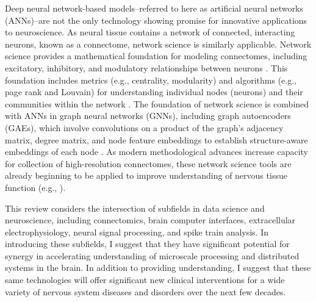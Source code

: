 \documentclass[11pt]{article}
\begin{document}
Deep neural network-based models--referred to here as artificial neural networks (ANNs)--are not the only technology showing promise for innovative applications to neuroscience. As neural tissue contains a network of connected, interacting neurons, known as a connectome, network science is similarly applicable. Network science provides a mathematical foundation for modeling connectomes, including excitatory, inhibitory, and modulatory relationships between neurons \cite{emmons2015connectomics, wikipedia2025networkscience, wikipedia2025neuron, wikipedia2025bnn, wikipedia2025connectome}. This foundation includes metrics (e.g., centrality, modularity) and algorithms (e.g., page rank and Louvain) for understanding individual nodes (neurons) and their communities within the network \cite{wikipedia2025networkscience, wikipedia2025pagerank, wikipedia2025louvain}. The foundation of network science is combined with ANNs in graph neural networks (GNNs), including graph autoencoders (GAEs), which involve convolutions on a product of the graph's adjacency matrix, degree matrix, and node feature embeddings to establish structure-aware embeddings of each node \cite{velickovic2018graphattentionnetworks, wikipedia2025gnn}. As modern methodological advances increase capacity for collection of high-resolution connectomes, these network science tools are already beginning to be applied to improve understanding of nervous tissue function (e.g., \cite{srinivasan2025gnnconnectome, neudorf2022gnnconnectome}).

This review considers the intersection of subfields in data science and neuroscience, including connectomics, brain computer interfaces, extracellular electrophysiology, neural signal processing, and spike train analysis. In introducing these subfields, I suggest that they have significant potential for synergy in accelerating understanding of microscale processing and distributed systems in the brain. In addition to providing understanding, I suggest that these same technologies will offer significant new clinical interventions for a wide variety of nervous system diseases and disorders over the next few decades.
\end{document}
